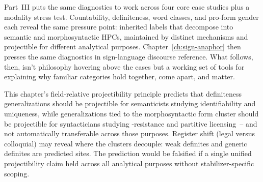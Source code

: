Part~III puts the same diagnostics to work across four core case studies plus a modality stress test. Countability, definiteness, word classes, and pro-form gender each reveal the same pressure point: inherited labels that decompose into semantic and morphosyntactic HPCs, maintained by distinct mechanisms and projectible for different analytical purposes. Chapter~\ref{ch:sign-anaphor} then presses the same diagnostics in sign-language discourse reference. What follows, then, isn't philosophy hovering above the cases but a working set of tools for explaining why familiar categories hold together, come apart, and matter.

\begin{definitenessthread}
This chapter's field-relative projectibility principle predicts that definiteness generalizations should be projectible for semanticists studying identifiability and uniqueness, while generalizations tied to the morphosyntactic form cluster should be projectible for syntacticians studying -resistance and partitive licensing~-- and not automatically transferable across those purposes. Register shift (\eg legal versus colloquial) may reveal where the clusters decouple: weak definites and generic definites are predicted sites. The prediction would be falsified if a single unified projectibility claim held across all analytical purposes without stabilizer-specific scoping.
\end{definitenessthread}
